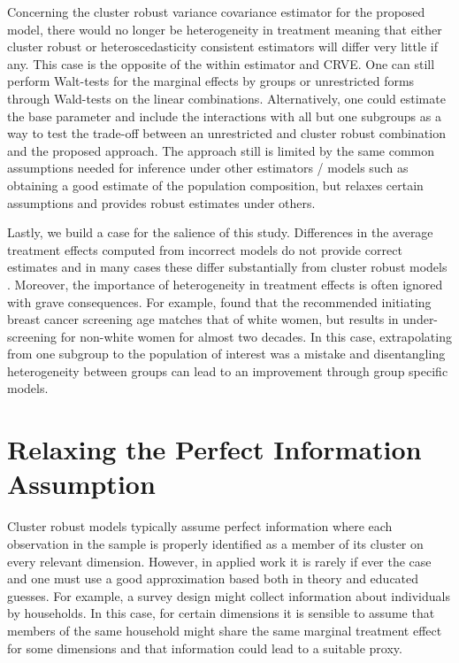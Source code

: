 \documentclass{jbsc}
\begin{document}
Concerning the cluster robust variance covariance estimator for the proposed model, there would no longer be heterogeneity in treatment meaning that either cluster robust or heteroscedasticity consistent estimators will differ very little if any. This case is the opposite of the within estimator and CRVE. One can still perform Walt-tests for the marginal effects by groups or unrestricted forms through Wald-tests on the linear combinations. Alternatively, one could estimate the base parameter and include the interactions with all but one subgroups as a way to test the trade-off between an unrestricted and cluster robust combination and the proposed approach. The approach still is limited by the same common assumptions needed for inference under other estimators / models such as obtaining a good estimate of the population composition, but relaxes certain assumptions and provides robust estimates under others.

Lastly, we build a case for the salience of this study. Differences in the average treatment effects computed from incorrect models do not provide correct estimates and in many cases these differ substantially from cluster robust models \citep{Gibbons_SúarezSerrato_Urbancic_2018}. Moreover, the importance of heterogeneity in treatment effects is often ignored with grave consequences. For example, \citet{Stapleton_Oseni_Bababekov_Hung_Chang_2018} found that the recommended initiating breast cancer screening age matches that of white women, but results in under-screening for non-white women for almost two decades. In this case, extrapolating from one subgroup to the population of interest was a mistake and disentangling heterogeneity between groups can lead to an improvement through group specific models.

\section{Relaxing the Perfect Information Assumption}

Cluster robust models typically assume perfect information where each observation in the sample is properly identified as a member of its cluster on every relevant dimension. However, in applied work it is rarely if ever the case and one must use a good approximation based both in theory and educated guesses. For example, a survey design might collect information about individuals by households. In this case, for certain dimensions it is sensible to assume that members of the same household might share the same marginal treatment effect for some dimensions and that information could lead to a suitable proxy.
\end{document}
